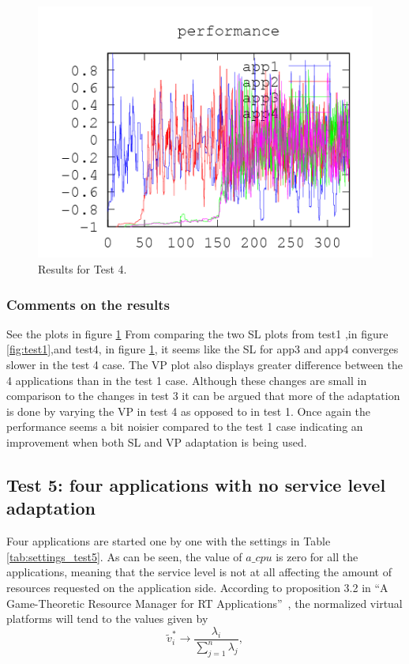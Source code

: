 \documentclass[nobiblatex]{LTHthesis}
\newcommand{\tv}{\tilde{v}}
\begin{document}
\begin{figure}[th]
\begin{minipage}{0.49\textwidth}
  \includegraphics[width=\textwidth]{"tools/plot/logs/test4/f"}
  \end{minipage}
\caption{Results for Test 4.}
\label{fig:test4}
\end{figure}

\clearpage
\subsubsection{Comments on the results}
See the plots in figure \ref{fig:test4}
From comparing the two SL plots from test1 ,in figure \ref{fig:test1},and test4, in figure \ref{fig:test4}, it seems like the SL for app3 and app4 converges slower in the test 4 case. 
The VP plot also displays greater difference between the 4 applications than in the test 1 case. Although these changes are small in comparison to the changes in test 3 it can be argued that more of the adaptation is done by varying the VP in test 4 as opposed to in test 1.
Once again the performance seems a bit noisier compared to the test 1 case indicating an improvement when both SL and VP adaptation is being used.

\subsection{Test 5: four applications with no service level adaptation}

Four applications are started one by one with the settings in 
Table \ref{tab:settings_test5}. As can be seen, the value of $a\_cpu$ is
zero for all the applications, meaning that the service level is not
at all affecting the amount of resources requested on the application side.
According to proposition 3.2 in ``A Game-Theoretic Resource Manager for 
RT Applications''~\cite{gtrm}, the normalized virtual platforms will tend 
to the values given by
\begin{equation}
  \tv_i^* \to \frac{\lambda_i}{\sum_{j=1}^{n}\lambda_j},
  \label{eq:SpecialStationaryPoint}
\end{equation}
\end{document}
